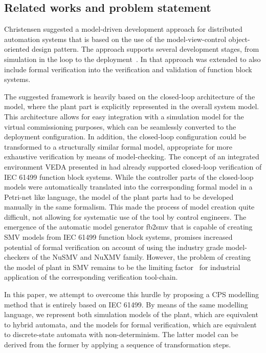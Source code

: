 \begin{bibunit}
\section{Related works and problem statement}\label{sec:related_work}

Christensen suggested a model-driven development approach \cite{christensen2000design} for distributed automation systems that is based on the use of the model-view-control object-oriented design pattern. The approach supports several development stages, from simulation in the loop to the deployment~\cite{patil2018adapting}. 
In \cite{vyatkin2008closed} that approach was extended to also include formal verification into the verification and validation of function block systems.

The suggested framework is heavily based on the closed-loop architecture of the model, where the plant part is explicitly represented in the overall system model. This architecture allows for easy integration with a simulation model for the virtual commissioning purposes, which can be seamlessly converted to the deployment configuration. In addition, the closed-loop configuration could be transformed to a structurally similar formal model, appropriate for more exhaustive verification by means of model-checking.   
The concept of an integrated environment VEDA presented in \cite{vyatkin2003verification} had already supported closed-loop verification of IEC 61499 function block systems. While the controller parts of the closed-loop models were automatically translated into the corresponding formal model in a Petri-net like language, the model of the plant parts had to be developed manually in the same formalism. 
This made the process of model creation quite difficult, not allowing for systematic use of the tool by control engineers. 
The emergence of the automatic model generator fb2smv \cite{fb2smv} that is capable of creating SMV models from IEC 61499 function block systems, promises increased potential of formal verification on account of using the industry grade model-checkers of the NuSMV \cite{cimatti2000nusmv} and NuXMV family. 
However, the problem of creating the model of plant in SMV remains to be the limiting factor~\cite{sinha2019survey} for industrial application of the corresponding verification tool-chain.

In this paper, we attempt to overcome this hurdle by proposing a CPS modelling method that is entirely based on IEC 61499. By means of the same modelling language, we represent both simulation models of the plant, which are equivalent to hybrid automata, and the models for formal verification, which are equivalent to discrete-state automata with non-determinism. 
The latter model can be derived from the former by applying a sequence of transformation steps. 


\end{bibunit}
